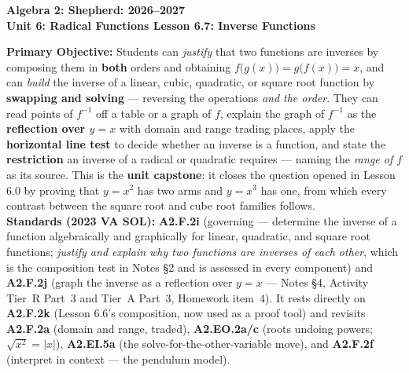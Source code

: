 \documentclass[10pt]{article}
\newcommand{\CourseName}{Algebra 2: Shepherd}
\newcommand{\SchoolYear}{2026--2027}
\newcommand{\UnitNumberName}{Unit 6: Radical Functions \quad}
\newcommand{\LessonNumberName}{Lesson 6.7: Inverse Functions}
\begin{document}
\begin{center}
    {\Large\bfseries \CourseName: \SchoolYear \\
    {\small\bfseries \UnitNumberName \LessonNumberName}}
\end{center}

\begin{tcolorbox}[colback=forestbg, colframe=forest, boxrule=0.9pt, arc=2mm,
    left=2mm, right=2mm, top=1.5mm, bottom=1.5mm]
    \textbf{Primary Objective:} Students can \emph{justify} that two functions are inverses by
    composing them in \textbf{both} orders and obtaining $f\big(g(x)\big)=g\big(f(x)\big)=x$, and can
    \emph{build} the inverse of a linear, cubic, quadratic, or square root function by
    \textbf{swapping and solving} --- reversing the operations \emph{and the order}. They can read
    points of $f^{-1}$ off a table or a graph of $f$, explain the graph of $f^{-1}$ as the
    \textbf{reflection over $y=x$} with domain and range trading places, apply the
    \textbf{horizontal line test} to decide whether an inverse is a function, and state the
    \textbf{restriction} an inverse of a radical or quadratic requires --- naming the \emph{range of
    $f$} as its source. This is the \textbf{unit capstone}: it closes the question opened in Lesson
    6.0 by proving that $y=x^{2}$ has two arms and $y=x^{3}$ has one, from which every contrast
    between the square root and cube root families follows.
    \\[2pt]
    \textbf{Standards (2023 VA SOL):} \textbf{A2.F.2i} (governing --- determine the inverse of a
    function algebraically and graphically for linear, quadratic, and square root functions;
    \emph{justify and explain why two functions are inverses of each other}, which is the
    composition test in Notes \S2 and is assessed in every component) and \textbf{A2.F.2j} (graph
    the inverse as a reflection over $y=x$ --- Notes \S4, Activity Tier~R Part~3 and Tier~A Part~3,
    Homework item~4). It rests directly on \textbf{A2.F.2k} (Lesson 6.6's composition, now used as
    a proof tool) and revisits \textbf{A2.F.2a} (domain and range, traded), \textbf{A2.EO.2a/c}
    (roots undoing powers; $\sqrt{x^{2}}=|x|$), \textbf{A2.EI.5a} (the solve-for-the-other-variable
    move), and \textbf{A2.F.2f} (interpret in context --- the pendulum model).
\end{tcolorbox}
\end{document}
